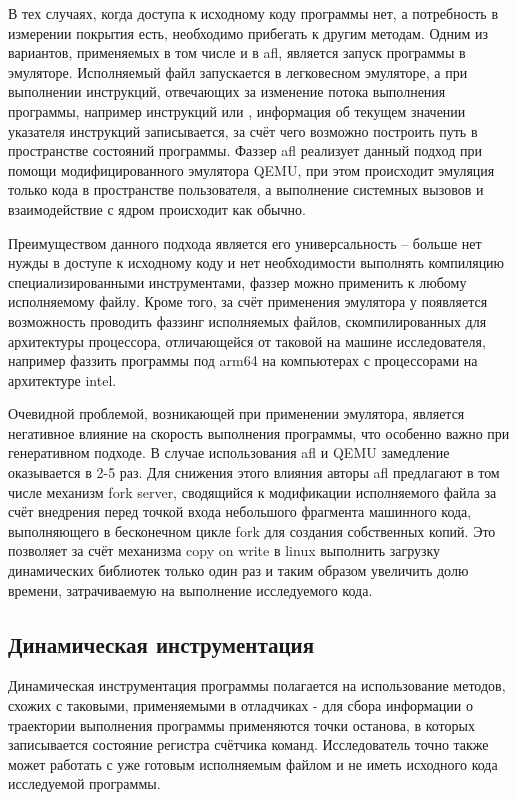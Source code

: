 В тех случаях, когда доступа к исходному коду программы нет, а потребность в измерении покрытия есть, необходимо прибегать к другим методам. Одним из вариантов, применяемых в том числе и в afl, является запуск программы в эмуляторе. Исполняемый файл запускается в легковесном эмуляторе, а при выполнении инструкций, отвечающих за изменение потока выполнения программы, например инструкций  или , информация об текущем значении указателя инструкций записывается, за счёт чего возможно построить путь в пространстве состояний программы. Фаззер afl реализует данный подход при помощи модифицированного эмулятора QEMU, при этом происходит эмуляция только кода в пространстве пользователя, а выполнение системных вызовов и взаимодействие с ядром происходит как обычно.

Преимуществом данного подхода является его универсальность -- больше нет нужды в доступе к исходному коду и нет необходимости выполнять компиляцию специализированными инструментами, фаззер можно применить к любому исполняемому файлу. Кроме того, за счёт применения эмулятора у появляется возможность проводить фаззинг исполняемых файлов, скомпилированных для архитектуры процессора, отличающейся от таковой на машине исследователя, например фаззить программы под arm64 на компьютерах с процессорами на архитектуре intel.

Очевидной проблемой, возникающей при применении эмулятора, является негативное влияние на скорость выполнения программы, что особенно важно при генеративном подходе. В случае использования afl и QEMU замедление оказывается в 2-5 раз. Для снижения этого влияния авторы afl предлагают в том числе механизм fork server, сводящийся к модификации исполняемого файла за счёт внедрения перед точкой входа небольшого фрагмента машинного кода, выполняющего в бесконечном цикле fork для создания собственных копий. Это позволяет за счёт механизма copy on write в linux выполнить загрузку динамических библиотек только один раз и таким образом увеличить долю времени, затрачиваемую на выполнение исследуемого кода.

\subsection{Динамическая инструментация}

Динамическая инструментация программы полагается на использование методов, схожих с таковыми, применяемыми в отладчиках - для сбора информации о траектории выполнения программы применяются точки останова, в которых записывается состояние регистра счётчика команд. Исследователь точно также может работать с уже готовым исполняемым файлом и не иметь исходного кода исследуемой программы.

